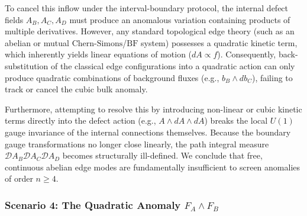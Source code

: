 \documentclass[aps,preprint,nofootinbib,preprintnumbers,eqsecnum,superscriptaddress]{revtex4}
\numberwithin{equation}{section}
\begin{document}
To cancel this inflow under the interval-boundary protocol, the internal defect fields $A_B, A_C, A_D$ must produce an anomalous variation containing products of multiple derivatives. However, any standard topological edge theory (such as an abelian or mutual $\text{Chern-Simons}$/$\text{BF}$ system) possesses a quadratic kinetic term, which inherently yields linear equations of motion ($dA \propto f$). Consequently, back-substitution of the classical edge configurations into a quadratic action can only produce quadratic combinations of background fluxes (e.g., $b_B \wedge db_C$), failing to track or cancel the cubic bulk anomaly.

Furthermore, attempting to resolve this by introducing non-linear or cubic kinetic terms directly into the defect action (e.g., $A \wedge dA \wedge dA$) breaks the local $U(1)$ gauge invariance of the internal connections themselves. Because the boundary gauge transformations no longer close linearly, the path integral measure $\mathcal{D}A_B \mathcal{D}A_C \mathcal{D}A_D$ becomes structurally ill-defined. We conclude that free, continuous abelian edge modes are fundamentally insufficient to screen anomalies of order $n \geq 4$.


\subsubsection{Scenario 4: The Quadratic Anomaly $F_A \wedge F_B$}
\label{sec:scenario4}
\end{document}
